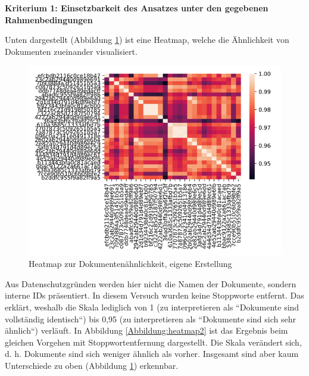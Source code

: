 {\bf Kriterium 1: Einsetzbarkeit des Ansatzes unter den gegebenen Rahmenbedingungen}

Unten dargestellt (Abbildung \ref{Abbildung:heatmap1}) ist eine Heatmap, welche die Ähnlichkeit von Dokumenten zueinander visualisiert. 

\begin{figure}[h]
\centering
\includegraphics[scale=0.95]{content/pics/Picture_12.png}
\caption{Heatmap zur Dokumentenähnlichkeit, eigene Erstellung}
\label{Abbildung:heatmap1}
\end{figure}

Aus Datenschutzgründen werden hier nicht die Namen der Dokumente, sondern interne IDs präsentiert. In diesem Versuch wurden keine Stoppworte entfernt. Das erklärt, weshalb die Skala lediglich von 1 (zu interpretieren als ``Dokumente sind vollständig identisch``) bis 0,95 (zu interpretieren als ``Dokumente sind sich sehr ähnlich``) verläuft. In Abbildung \ref{Abbildung:heatmap2} ist das Ergebnis beim gleichen Vorgehen mit Stoppwortentfernung dargestellt. Die Skala verändert sich, d. h. Dokumente sind sich weniger ähnlich als vorher. Insgesamt sind aber kaum Unterschiede zu oben (Abbildung \ref{Abbildung:heatmap1}) erkennbar. 
 
